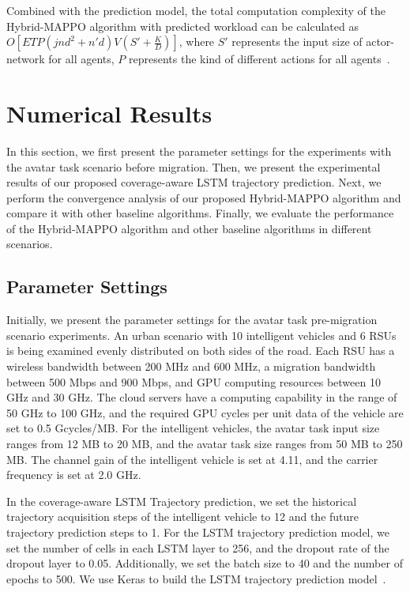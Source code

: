 \documentclass[lettersize,journal]{IEEEtran}
\begin{document}
Combined with the prediction model, the total computation complexity of the Hybrid-MAPPO algorithm with predicted workload can be calculated as $O[ETP(jnd^2+n'd)V(S' + \frac{K}{D})]$, where $S'$ represents the input size of actor-network for all agents, $P$ represents the kind of different actions for all agents~\cite{gong2022computation}.

\section{Numerical Results}\label{exp}
In this section, we first present the parameter settings for the experiments with the avatar task scenario before migration. Then, we present the experimental results of our proposed coverage-aware LSTM trajectory prediction. Next, we perform the convergence analysis of our proposed Hybrid-MAPPO algorithm and compare it with other baseline algorithms. Finally, we evaluate the performance of the Hybrid-MAPPO algorithm and other baseline algorithms in different scenarios.

\subsection{Parameter Settings}

Initially, we present the parameter settings for the avatar task pre-migration scenario experiments. An urban scenario with 10 intelligent vehicles and 6 RSUs is being examined evenly distributed on both sides of the road. Each RSU has a wireless bandwidth between 200 MHz and 600 MHz, a migration bandwidth between 500 Mbps and 900 Mbps, and GPU computing resources between 10 GHz and 30 GHz. The cloud servers have a computing capability in the range of 50 GHz to 100 GHz, and the required GPU cycles per unit data of the vehicle are set to 0.5 Gcycles/MB. For the intelligent vehicles, the avatar task input size ranges from 12 MB to 20 MB, and the avatar task size ranges from 50 MB to 250 MB. The channel gain of the intelligent vehicle is set at 4.11, and the carrier frequency is set at 2.0 GHz.

In the coverage-aware LSTM Trajectory prediction, we set the historical trajectory acquisition steps of the intelligent vehicle to 12 and the future trajectory prediction steps to 1. For the LSTM trajectory prediction model, we set the number of cells in each LSTM layer to 256, and the dropout rate of the dropout layer to 0.05. Additionally, we set the batch size to 40 and the number of epochs to 500. We use Keras to build the LSTM trajectory prediction model~\cite{Keras}.
\end{document}
